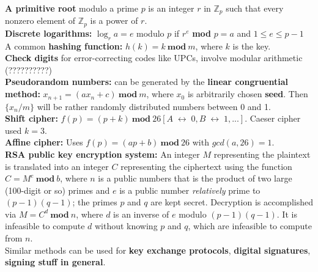 \documentclass[12pt]{article}
\newcommand{\Z}{\mathbb{Z}}
\renewcommand{\iff}{\;\leftrightarrow\;}
\begin{document}
\textbf{A primitive root} modulo a prime $p$ is an integer $r$ in $\Z_p$ such that every nonzero element of $\Z_p$ is a power of $r$. \\
\textbf{Discrete logarithms:} $\log_r a = e$ modulo $p$ if $r^e$ \textbf{mod} $p = a$ and $1 \leq e \leq p -1$  \\
A common \textbf{hashing function:} $h(k) = k\ \textbf{mod}\ m$, where $k$ is the key. \\
\textbf{Check digits} for error-correcting codes like UPCs, involve modular arithmetic (??????????) \\
\textbf{Pseudorandom numbers:} can be generated by the \textbf{linear congruential method:} $x_{n+1} = (ax_n +c)\ \textbf{mod}\ m$, where $x_0$ is arbitrarily chosen \textbf{seed}. Then $\{x_n/m\}$ will be rather randomly distributed numbers between 0 and 1. \\
\textbf{Shift cipher:} $f(p) = (p + k)\ \textbf{mod}\ 26 [A \iff 0, B \iff 1,...]$. Caeser cipher used $k=3$. \\
\textbf{Affine cipher:} Uses $f(p) = (ap+b)\ \textbf{mod}\ 26$ with $gcd(a,26)=1$. \\
\textbf{RSA public key encryption system:} An integer $M$ representing the plaintext is translated into an integer $C$ representing the ciphertext using the function $C = M^e\ \textbf{mod}\ b$, where $n$ is a public numbers that is the product of two large (100-digit or so) primes and $e$ is a public number \textit{relatively} prime to $(p-1)(q-1)$; the primes $p$ and $q$ are kept secret. Decryption is accomplished via $M=C^d\ \textbf{mod}\ n$, where $d$ is an inverse of $e$ modulo $(p-1)(q-1)$. It is infeasible to compute $d$ without knowing $p$ and $q$, which are infeasible to compute from $n$. \\
Similar methods can be used for \textbf{key exchange protocols}, \textbf{digital signatures}, \textbf{signing stuff in general}. \\
\newpage
\end{document}
